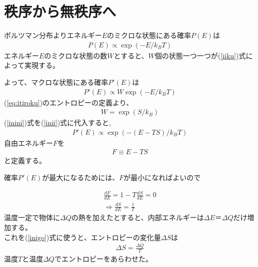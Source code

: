 \section{秩序から無秩序へ}
ボルツマン分布よりエネルギー$E$のミクロな状態にある確率$P(E)$は
\begin{align}
  P(E)\propto\exp{(-E/{k_BT})}    \label{inio}
\end{align}
エネルギー$E$のミクロな状態の数$W$とすると、$W$個の状態一つ一つが(\ref{iiku})式によって実現する。\par
よって、マクロな状態にある確率$P'(E)$は
\begin{align}
   P'(E)\propto W\exp{(-E/{k_BT}) }   \label{inii}
\end{align}
(\ref{eq:itiroku})のエントロピーの定義より、
\begin{align}
   W=\exp{(S/k_B)}   \label{inini}
\end{align}
(\ref{inini})式を(\ref{inii})式に代入すると,
\begin{align}
   P'(E)\propto \exp{(-(E-TS)/{k_BT})}   \label{ijisa}
\end{align}
自由エネルギー$F$を
\begin{align}
   F\equiv E-TS    \label{Fteigi}
\end{align}
と定義する。\par
確率$P'(E)$が最大になるためには、$F$が最小になればよいので

\begin{align}
  \frac{dF}{dE}=1-T\frac{dS}{dE}=0\\
	\Rightarrow \frac{dS}{dE}=\frac{1}{T} \label{inigo}
\end{align}
温度一定で物体に$\Delta Q$の熱を加えたとすると、内部エネルギーは$\Delta E＝\Delta Q$だけ増加する。\\
これを(\ref{inigo})式に使うと、エントロピーの変化量$\Delta S$は
\begin{align*}
  \Delta S=\frac{\Delta Q}{T}
\end{align*}
温度$T$と温度$\Delta Q$でエントロピーをあらわせた。
